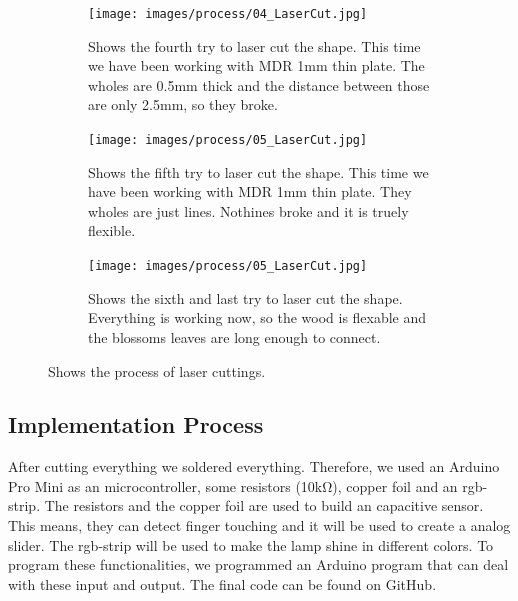 \documentclass[doc.tex]{subfiles}
\begin{document}
\begin{figure}[H]
            \begin{subfigure}{.45\textwidth}
                \centering
                \texttt{[image: images/process/04\_LaserCut.jpg]}
                \caption{Shows the fourth try to laser cut the shape. This time we have been
                         working with MDR 1mm thin plate. The wholes are 0.5mm thick and the 
                         distance between those are only 2.5mm, so they broke.}
                \label{fig:04_LaserCut}
                \vspace{6mm}
            \end{subfigure}
            \hspace{1mm}
            \begin{subfigure}{.45\textwidth}
                \centering
                \texttt{[image: images/process/05\_LaserCut.jpg]}
                \caption{Shows the fifth try to laser cut the shape. This time we have been
                         working with MDR 1mm thin plate. They wholes are just lines. Nothines
                         broke and it is truely flexible.}
                \label{fig:04_LaserCut}
                \vspace{6mm}
            \end{subfigure}
            \hspace{1mm}
            \begin{subfigure}{.45\textwidth}
                \centering
                \texttt{[image: images/process/05\_LaserCut.jpg]}
                \caption{Shows the sixth and last try to laser cut the shape. Everything is 
                working now, so the wood is flexable and the blossoms leaves are long enough
                to connect. }
                \label{fig:04_LaserCut}
                \vspace{6mm}
            \end{subfigure}
            \caption{Shows the process of laser cuttings.}
            \label{fig:laserCutTests}
        \end{figure}
        \noindent

    \subsection{Implementation Process}
        \begin{flushleft}
            After cutting everything we soldered everything. Therefore, we used an Arduino Pro Mini \cite{arduinoProMini} 
            as an microcontroller, some resistors (10k\si{\ohm}), copper foil and an rgb-strip. \newline
            The resistors and the copper foil are used to build an capacitive sensor. \cite{Badger2019} 
            This means, they can detect finger touching and it will be used to create a analog slider.
            The rgb-strip will be used to make the lamp shine in different colors. \cite{Burgess2019} 
            \newline 
            \noindent
            To program these functionalities, we programmed an Arduino program that can deal with these input 
            and output. The final code can be found on GitHub. %
        \end{flushleft}
\end{document}
